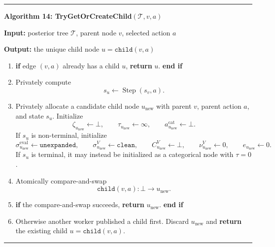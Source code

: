 \documentclass[11pt]{article}
\newcommand{\Tree}{\mathcal{T}}
\newcommand{\Step}{\operatorname{Step}}
\newenvironment{algorithmblock}[1]
{
  \par\medskip
  \noindent\hrule\par\smallskip
  \noindent\textbf{#1}
  \par\smallskip
}
{
  \par\smallskip\noindent\hrule\par\medskip
}
\newcommand{\Input}{\textbf{Input: }}
\newcommand{\Output}{\textbf{Output: }}
\newcommand{\Return}{\textbf{return }}
\newcommand{\If}{\textbf{if }}
\newcommand{\EndIf}{\textbf{end if}}
\begin{document}
\begin{algorithmblock}{Algorithm 14: TryGetOrCreateChild\((\Tree,v,a)\)}

\Input posterior tree \(\Tree\), parent node \(v\), selected action \(a\)

\Output the unique child node \(u=\texttt{child}(v,a)\)

\begin{enumerate}[leftmargin=2em]
  \item \If edge \((v,a)\) already has a child \(u\), \Return \(u\). \EndIf

  \item Privately compute
  \[
  s_u\gets\Step(s_v,a).
  \]

  \item Privately allocate a candidate child node \(u_{\mathrm{new}}\) with
  parent \(v\), parent action \(a\), and state \(s_u\). Initialize
  \[
  \zeta_{u_{\mathrm{new}}}\gets\bot,
  \qquad
  \tau_{u_{\mathrm{new}}}\gets\infty,
  \qquad
  a_{u_{\mathrm{new}}}^{\mathrm{cat}}\gets\bot.
  \]
  If \(s_u\) is non-terminal, initialize
  \[
  \sigma^{\mathrm{eval}}_{u_{\mathrm{new}}}\gets\texttt{unexpanded},
  \qquad
  \sigma^V_{u_{\mathrm{new}}}\gets\texttt{clean},
  \qquad
  C^V_{u_{\mathrm{new}}}\gets\bot,
  \qquad
  \nu^V_{u_{\mathrm{new}}}\gets 0,
  \qquad
  e_{u_{\mathrm{new}}}\gets 0.
  \]
  If \(s_u\) is terminal, it may instead be initialized as a categorical node
  with \(\tau=0\).

  \item Atomically compare-and-swap
  \[
  \texttt{child}(v,a):\bot\rightarrow u_{\mathrm{new}}.
  \]

  \item \If the compare-and-swap succeeds, \Return \(u_{\mathrm{new}}\). \EndIf

  \item Otherwise another worker published a child first. Discard
  \(u_{\mathrm{new}}\) and \Return the existing child \(u=\texttt{child}(v,a)\).
\end{enumerate}

\end{algorithmblock}
\end{document}
